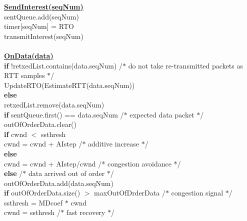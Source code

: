 \documentclass[10pt]{article}
\begin{document}
\begin{mdframed}
  \underline{\textbf{SendInterest(seqNum)}} \\
  \-\hspace{1em} sentQueue.add(seqNum)\\
  \-\hspace{1em} timer[seqNum] = RTO\\
  \-\hspace{1em} transmitInterest(seqNum)\\\\
  \underline{\textbf{OnData(data)}} \\
  \-\hspace{1em} \textbf{if} !retxedList.contains(data.seqNum) /$*$ do
  not take re-transmitted packets as RTT samples $*$/\\
  \-\hspace{2em} UpdateRTO(EstimateRTT(data.seqNum))\\
  \-\hspace{1em} \textbf{else}\\
  \-\hspace{2em} retxedList.remove(data.seqNum)\\
  \-\hspace{1em} \textbf{if} sentQueue.first() == data.seqNum
  /$*$ expected data packet $*$/\\
  \-\hspace{2em} outOfOrderData.clear()\\
  \-\hspace{2em} \textbf{if} cwnd $<$ ssthresh\\
  \-\hspace{3em} cwnd = cwnd + AIstep /$*$ additive increase $*$/ \\
  \-\hspace{2em} \textbf{else} \\
  \-\hspace{3em} cwnd = cwnd + AIstep/cwnd /* congestion avoidance */
  \\
  \-\hspace{1em} \textbf{else} /$*$ data arrived out of order $*$/ \\
  \-\hspace{2em} outOfOrderData.add(data.seqNum)\\
  \-\hspace{2em} \textbf{if} outOfOrderData.size() $>$
  maxOutOfDrderData /$*$ congestion signal $*$/\\
  \-\hspace{3em} ssthresh =  MDcoef $*$ cwnd\\
  \-\hspace{3em} cwnd = ssthresh /$*$ fast recovery $*$/ \\

\end{mdframed}
\end{document}
